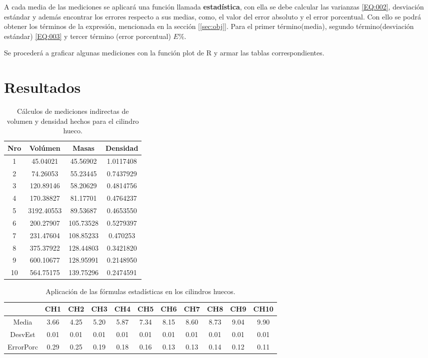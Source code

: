 \documentclass[%
 reprint,
groupedaddress,
unsortedaddress,
 amsmath,amssymb,
 aps,
superscriptaddress
]{revtex4-2}
\begin{document}
A cada media de las mediciones se aplicará una función llamada \textbf{estadística}, con ella se debe calcular las varianzas \eqref{EQ:002}, desviación estándar y además encontrar los errores respecto a sus medias, como, el valor del error absoluto y el error porcentual. Con ello se podrá obtener los términos de la expresión, mencionada en la sección [\ref{sec:obj}]. Para el primer término(media), segundo término(desviación estándar) \eqref{EQ:003} y tercer término (error porcentual) $E\%$.

Se procederá a graficar algunas mediciones con la función plot de R y armar las tablas correspondientes. 

\section{Resultados}
\label{Sec:res}

\begin{table}[h]
	\label{volmasden}
	\centering
	\caption{Cálculos de mediciones indirectas de volumen y densidad hechos para el cilindro hueco.}
	\begin{tabular}{|c|c|c|c|}
		\hline
		Nro & Volúmen & Masas &Densidad  \\
		\hline
		1 & 45.04021 & 45.56902 &1.0117408  \\
		\hline
		2 & 74.26053  &55.23445   & 0.7437929 \\
		\hline
		3 & 120.89146  &58.20629    &0.4814756 \\
		\hline
		4 &170.38827 & 81.17701   &0.4764237\\
		\hline
		5 &3192.40553 & 89.53687  &0.4653550\\
		\hline
		6 &200.27907 & 105.73528  &0.5279397\\
		\hline
		7 &231.47604 & 108.85233  &0.470253\\
		\hline
		8 &375.37922 & 128.44803  &0.3421820\\
		\hline
		9 &600.10677 & 128.95991  &0.2148950\\
		\hline
		10 &564.75175& 139.75296  &0.2474591\\
		\hline
	\end{tabular}
\end{table}

\begin{table}[h]
	\label{estadcil}
	\centering
	\caption{Aplicación de las fórmulas estadísticas en los cilindros huecos.}
	\begin{tabular}{|c|c|c|c|c|c|c|c|c|c|c|}
		\hline
              &CH1   &CH2&   CH3&   CH4&   CH5&   CH6&   CH7&   CH8&   CH9&  CH10\\
                \hline
Media&         3.66& 4.25& 5.20& 5.87& 7.34& 8.15& 8.60& 8.73& 9.04& 9.90\\
\hline
DesvEst& 0.01& 0.01& 0.01& 0.01& 0.01& 0.01& 0.01& 0.01& 0.01& 0.01\\
\hline
ErrorPorc&     0.29& 0.25& 0.19& 0.18& 0.16& 0.13& 0.13& 0.14& 0.12& 0.11\\
\hline
	\end{tabular}
\end{table}
\end{document}
